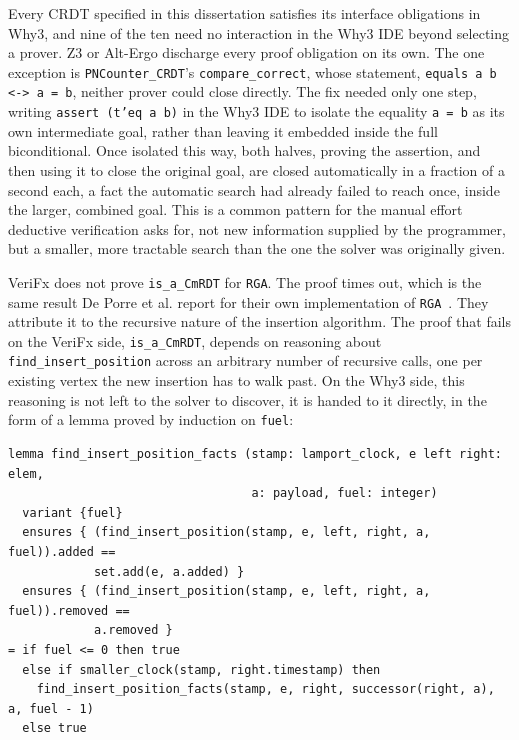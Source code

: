 Every CRDT specified in this dissertation satisfies its interface obligations in Why3, and nine of the ten need no
interaction in the Why3 IDE beyond selecting a prover. Z3 or Alt-Ergo discharge every proof obligation on its own.
The one exception is \texttt{PNCounter\_CRDT}'s \texttt{compare\_correct}, whose statement, \texttt{equals a b <-> a = b},
neither prover could close directly. The fix needed only one step, writing \texttt{assert (t'eq a b)} in the Why3 IDE to
isolate the equality \texttt{a = b} as its own intermediate goal, rather than leaving it embedded inside the full
biconditional. Once isolated this way, both halves, proving the assertion, and then using it to close the original goal,
are closed automatically in a fraction of a second each, a fact the automatic search had already failed to reach once,
inside the larger, combined goal. This is a common pattern for the manual effort deductive verification asks for, not new
information supplied by the programmer, but a smaller, more tractable search than the one the solver was originally given.

VeriFx does not prove \texttt{is\_a\_CmRDT} for \texttt{RGA}. The proof times out, which is the same result De Porre et
al. report for their own implementation of \texttt{RGA}~\cite{porre2023masses}. They attribute it to the recursive nature
of the insertion algorithm. The proof that fails on the VeriFx side, \texttt{is\_a\_CmRDT}, depends on reasoning about \texttt{find\_insert\_position}
across an arbitrary number of recursive calls, one per existing vertex the new insertion has to walk past. On the Why3
side, this reasoning is not left to the solver to discover, it is handed to it directly, in the form of a lemma proved by
induction on \texttt{fuel}:

\begin{lstlisting}[caption={An inductive proof of \texttt{find\_insert\_position}, by \texttt{fuel}}, label={lst:rga-lemma}]
lemma find_insert_position_facts (stamp: lamport_clock, e left right: elem,
                                  a: payload, fuel: integer)
  variant {fuel}
  ensures { (find_insert_position(stamp, e, left, right, a, fuel)).added ==
            set.add(e, a.added) }
  ensures { (find_insert_position(stamp, e, left, right, a, fuel)).removed ==
            a.removed }
= if fuel <= 0 then true
  else if smaller_clock(stamp, right.timestamp) then
    find_insert_position_facts(stamp, e, right, successor(right, a), a, fuel - 1)
  else true
\end{lstlisting}

